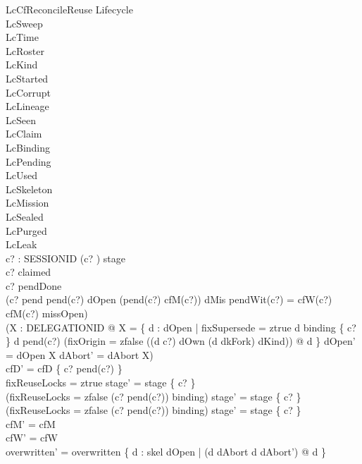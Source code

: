 \documentclass[a4paper,10pt,fleqn]{article}
\begin{document}
\begin{schema}{LcCfReconcileReuse}
\Delta Lifecycle \\
\Xi LcSweep \\
\Xi LcTime \\
\Xi LcRoster \\
\Xi LcKind \\
\Xi LcStarted \\
\Xi LcCorrupt \\
\Xi LcLineage \\
\Xi LcSeen \\
\Xi LcClaim \\
\Xi LcBinding \\
\Xi LcPending \\
\Xi LcUsed \\
\Xi LcSkeleton \\
\Xi LcMission \\
\Xi LcSealed \\
\Xi LcPurged \\
\Xi LcLeak \\
c? : SESSIONID
\where
(c? ) \in stage \\
c? \notin \dom claimed \\
c? \notin pendDone \\
(c? \in \dom pend \land pend(c?) \in dOpen \land (pend(c?) \mapsto cfM(c?)) \in dMis \land pendWit(c?) = cfW(c?) \land cfM(c?) \in missOpen) \\
(\exists X : \power DELEGATIONID @ X = \{ d : dOpen | fixSupersede = ztrue \land d \in binding \limg \{ c? \} \rimg \land d \neq pend(c?) \land (fixOrigin = zfalse \lor ((d \mapsto c?) \in dOwn \land (d \mapsto dkFork) \in dKind)) @ d \} \land dOpen' = dOpen \setminus X \land dAbort' = dAbort \cup X) \\
cfD' = cfD \oplus \{ c? \mapsto pend(c?) \} \\
fixReuseLocks = ztrue \implies stage' = stage \oplus \{ c?  \} \\
(fixReuseLocks = zfalse \land (c? \mapsto pend(c?)) \in binding) \implies stage' = stage \oplus \{ c?  \} \\
(fixReuseLocks = zfalse \land (c? \mapsto pend(c?)) \notin binding) \implies stage' = stage \oplus \{ c?  \} \\
cfM' = cfM \\
cfW' = cfW \\
overwritten' = overwritten \cup \{ d : skel \setminus dOpen | (d \in dAbort \iff d \notin dAbort') @ d \} \\

\end{schema}
\end{document}
